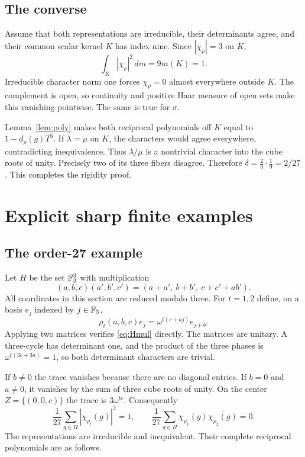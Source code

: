 \documentclass[11pt]{article}
\theoremstyle{definition}\newtheorem{definition}[theorem]{Definition}
\theoremstyle{remark}\newtheorem{remark}[theorem]{Remark}
\begin{document}
\subsection{The converse}

Assume that both representations are irreducible, their determinants agree, and their common scalar kernel $K$ has index nine. Since $|\chi_\rho|=3$ on $K$,
\[
 \int_K|\chi_\rho|^2\,dm=9m(K)=1.
\]
Irreducible character norm one forces $\chi_\rho=0$ almost everywhere outside $K$. The complement is open, so continuity and positive Haar measure of open sets make this vanishing pointwise. The same is true for $\sigma$.

Lemma~\ref{lem:poly} makes both reciprocal polynomials off $K$ equal to
$1-d_\rho(g)T^3$. If $\lambda=\mu$ on $K$, the characters would agree everywhere, contradicting inequivalence. Thus $\lambda/\mu$ is a nontrivial character into the cube roots of unity. Precisely two of its three fibers disagree. Therefore $\delta=\frac23\cdot\frac19=2/27$. This completes the rigidity proof.

\section{Explicit sharp finite examples}

\subsection{The order-27 example}

Let $H$ be the set $\mathbb F_3^3$ with multiplication
\begin{equation}\label{eq:Hmul}
 (a,b,c)(a',b',c')=(a+a',\ b+b',\ c+c'+ab').
\end{equation}
All coordinates in this section are reduced modulo three. For $t=1,2$ define, on a basis $e_j$ indexed by $j\in\mathbb F_3$,
\begin{equation}\label{eq:Hrep}
 \rho_t(a,b,c)e_j=\omega^{t(c+aj)}e_{j+b}.
\end{equation}
Applying two matrices verifies \eqref{eq:Hmul} directly. The matrices are unitary. A three-cycle has determinant one, and the product of the three phases is
$\omega^{t(3c+3a)}=1$, so both determinant characters are trivial.

If $b\ne0$ the trace vanishes because there are no diagonal entries. If $b=0$ and $a\ne0$, it vanishes by the sum of three cube roots of unity. On the center
$Z=\{(0,0,c)\}$ the trace is $3\omega^{tc}$. Consequently
\[
 \frac1{27}\sum_{g\in H}|\chi_{\rho_t}(g)|^2=1,
 \qquad
 \frac1{27}\sum_{g\in H}\chi_{\rho_1}(g)\overline{\chi_{\rho_2}(g)}=0.
\]
The representations are irreducible and inequivalent. Their complete reciprocal polynomials are as follows.
\end{document}
